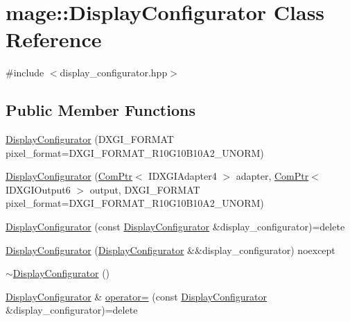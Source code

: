 \hypertarget{classmage_1_1_display_configurator}{}\section{mage\+:\+:Display\+Configurator Class Reference}
\label{classmage_1_1_display_configurator}


{\ttfamily \#include $<$display\+\_\+configurator.\+hpp$>$}

\subsection*{Public Member Functions}
\begin{DoxyCompactItemize}
\item 
\hyperlink{classmage_1_1_display_configurator_a88fe13ec0a6902fdc1666a2710a16647}{Display\+Configurator} (D\+X\+G\+I\+\_\+\+F\+O\+R\+M\+AT pixel\+\_\+format=D\+X\+G\+I\+\_\+\+F\+O\+R\+M\+A\+T\+\_\+\+R10\+G10\+B10\+A2\+\_\+\+U\+N\+O\+RM)
\item 
\hyperlink{classmage_1_1_display_configurator_a2080c8163974aaa9a16f84e65126b355}{Display\+Configurator} (\hyperlink{namespacemage_ae74f374780900893caa5555d1031fd79}{Com\+Ptr}$<$ I\+D\+X\+G\+I\+Adapter4 $>$ adapter, \hyperlink{namespacemage_ae74f374780900893caa5555d1031fd79}{Com\+Ptr}$<$ I\+D\+X\+G\+I\+Output6 $>$ output, D\+X\+G\+I\+\_\+\+F\+O\+R\+M\+AT pixel\+\_\+format=D\+X\+G\+I\+\_\+\+F\+O\+R\+M\+A\+T\+\_\+\+R10\+G10\+B10\+A2\+\_\+\+U\+N\+O\+RM)
\item 
\hyperlink{classmage_1_1_display_configurator_a20d8fa60a9d511a114e603dddf1a3716}{Display\+Configurator} (const \hyperlink{classmage_1_1_display_configurator}{Display\+Configurator} \&display\+\_\+configurator)=delete
\item 
\hyperlink{classmage_1_1_display_configurator_ae1b3c24b5a268bcf2f38ddc15721afa8}{Display\+Configurator} (\hyperlink{classmage_1_1_display_configurator}{Display\+Configurator} \&\&display\+\_\+configurator) noexcept
\item 
\hyperlink{classmage_1_1_display_configurator_af6546383269503e3cab077e4bf54556e}{$\sim$\+Display\+Configurator} ()
\item 
\hyperlink{classmage_1_1_display_configurator}{Display\+Configurator} \& \hyperlink{classmage_1_1_display_configurator_adf24194f83a0971a1c3076c1a23d1699}{operator=} (const \hyperlink{classmage_1_1_display_configurator}{Display\+Configurator} \&display\+\_\+configurator)=delete
\item 

\end{DoxyCompactItemize}
